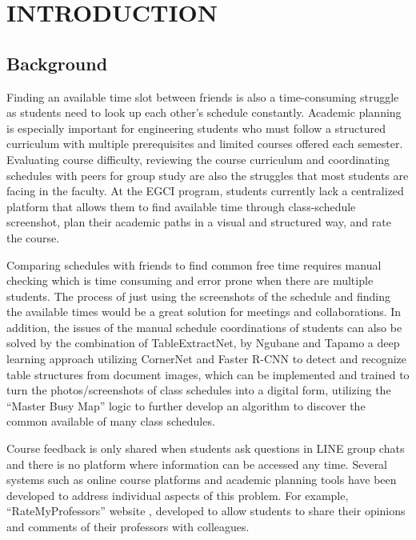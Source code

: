 \chapter{INTRODUCTION}

\section{Background}
\setlength{\parindent}{0pt}
\hspace{1.6 cm}Finding an available time slot between friends is also a time-consuming struggle as students need to look up each other’s schedule constantly. Academic planning is especially important for engineering students who must follow a structured curriculum with multiple prerequisites and limited courses offered each semester. Evaluating course difficulty, reviewing the course curriculum and coordinating schedules with peers for group study are also the struggles that most students are facing in the faculty. At the EGCI program, students currently lack a centralized platform that allows them to find available time through class-schedule screenshot, plan their academic paths in a visual and structured way, and  rate the course. 

\hspace{1.6 cm}Comparing schedules with friends to find common free time requires manual checking which is time consuming and error prone when there are multiple students. The process of just using the screenshots of the schedule and finding the available times would be a great solution for  meetings and collaborations.  In addition, the issues of the manual schedule coordinations of students can also be solved by the combination of TableExtractNet, by Ngubane and Tapamo \cite{ngubane2024tableextractnet} a deep learning approach utilizing CornerNet and Faster R-CNN to detect and recognize table structures from document images, which can be implemented and trained to turn the photos/screenshots of class schedules into a digital form, utilizing the “Master Busy Map” logic \cite{paper_7} to further develop an algorithm to discover the common available of many class schedules.

\hspace{1.6 cm}Course feedback is only shared when students ask questions in LINE group chats and there is no platform where information can be accessed any time. Several systems such as online course platforms and academic planning tools have been developed to address individual aspects of this problem. For example, “RateMyProfessors” website \cite{ratemyprofessors}, developed to allow students to share their opinions and comments of their professors with colleagues.

